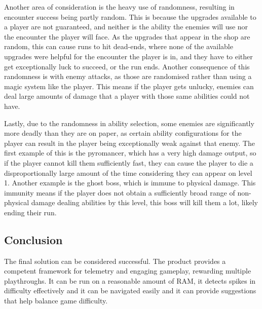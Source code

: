 Another area of consideration is the heavy use of randomness, resulting in encounter success being partly random. This is because the upgrades available to a player are not guaranteed, and neither is the ability the enemies will use nor the encounter the player will face. As the upgrades that appear in the shop are random, this can cause runs to hit dead-ends, where none of the available upgrades were helpful for the encounter the player is in, and they have to either get exceptionally luck to succeed, or the run ends. Another consequence of this randomness is with enemy attacks, as those are randomised rather than using a magic system like the player. This means if the player gets unlucky, enemies can deal large amounts of damage that a player with those same abilities could not have. 

Lastly, due to the randomness in ability selection, some enemies are significantly more deadly than they are on paper, as certain ability configurations for the player can result in the player being exceptionally weak against that enemy. The first example of this is the pyromancer, which has a very high damage output, so if the player cannot kill them sufficiently fast, they can cause the player to die a disproportionally large amount of the time considering they can appear on level 1. Another example is the ghost boss, which is immune to physical damage. This immunity means if the player does not obtain a sufficiently broad range of non-physical damage dealing abilities by this level, this boss will kill them a lot, likely ending their run. 

\subsection{Conclusion}

The final solution can be considered successful. The product provides
a competent framework for telemetry and engaging gameplay, rewarding
multiple playthroughs. It can be run on a reasonable
amount of RAM, it detects spikes in difficulty effectively and it can be
navigated easily and it can provide suggestions that help balance game
difficulty.

